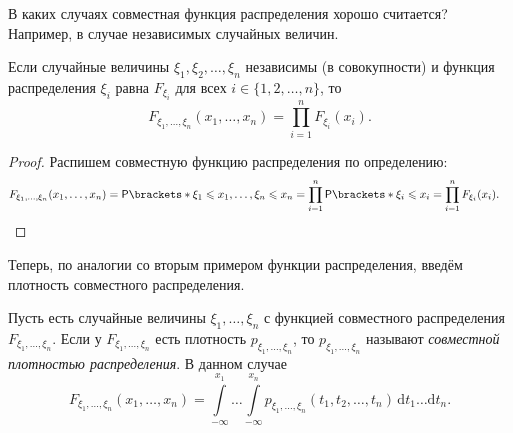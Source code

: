 В каких случаях совместная функция распределения хорошо считается? Например, в случае независимых случайных величин.
\begin{theorem}
	Если случайные величины \(\xi_1, \xi_2, \dots, \xi_n\) независимы (в совокупности) и функция распределения \(\xi_i\) равна \(F_{\xi_i}\) для всех \(i \in \{1, 2, \dots, n\}\), то
	\[
	F_{\xi_1, \dots, \xi_n}(x_1, \dots, x_n) = \prod\limits_{i = 1}^{n} F_{\xi_i}(x_i).
	\]
\end{theorem}
\begin{proof}
	Распишем совместную функцию распределения по определению:
	\begin{align}
		F_{\xi_1, \dots, \xi_n}(x_1, \dots, x_n) &= \Pr{\xi_1 \leq x_1, \dots, \xi_n \leq x_n} = \prod\limits_{i = 1}^{n} \Pr{\xi_i \leq x_i} = \prod\limits_{i = 1}^{n} F_{\xi_i}(x_i). \qedhere
	\end{align}
\end{proof}
Теперь, по аналогии со вторым примером функции распределения, введём плотность совместного распределения.
\begin{definition}
	Пусть есть случайные величины \(\xi_1, \dots, \xi_n\) с функцией совместного распределения \(F_{\xi_1, \dots, \xi_n}\). Если у \(F_{\xi_1, \dots, \xi_n}\) есть плотность \(p_{\xi_1, \dots, \xi_n}\), то \(p_{\xi_1, \dots, \xi_n}\) называют \emph{совместной плотностью распределения}. В данном случае
	\[
	F_{\xi_1, \dots, \xi_n}(x_1, \dots, x_n) = \int\limits_{-\infty}^{x_1} \dots \int\limits_{-\infty}^{x_n} p_{\xi_1, \dots, \xi_n}(t_1, t_2, \dots, t_n)\,\mathrm{d}t_1\dots\mathrm{d}t_n.
	\]
\end{definition}

